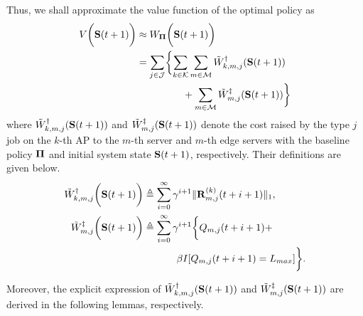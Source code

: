 Thus, we shall approximate the value function of the optimal policy as
\begin{align}
    V\Paren{\Stat(t+1)} &\approx W_{\Baseline}\Paren{\Stat(t+1)}
    \nonumber\\
    &= \sum_{j\in\jSpace}\Brace{
        \sum_{k\in\apSet}\sum_{m\in\esSet} \tilde{W}^{\AP}_{k,m,j}(\Stat(t+1))
        \nonumber\\
        &~~~~~~~~~~~~~~+\sum_{m\in\esSet} \tilde{W}^{\ES}_{m,j}(\Stat(t+1))
    }
\end{align}
where $\tilde{W}^{\dagger}_{k,m,j}(\mathbf{S}(t+1))$ and $\tilde{W}^{\ddagger}_{m,j}(\mathbf{S}(t+1))$ denote the cost raised by the type $j$ job on the $k$-th AP to the $m$-th server and $m$-th edge servers with the baseline policy $\boldsymbol{\Pi}$ and initial system state $\mathbf{S}(t+1)$, respectively.
Their definitions are given below.
{\small
\begin{align}
    \tilde{W}^{\dagger}_{k,m,j} \bigg(\mathbf{S}(t+1)\bigg) &\triangleq
        \sum_{i=0}^{\infty} \gamma^{i+1} \lVert\mathbf{R}^{(k)}_{m,j}(t+i+1)\|_1,
    \\    
    \tilde{W}^{\ddagger}_{m,j} \bigg(\mathbf{S}(t+1)\bigg) &\triangleq
        \sum_{i=0}^{\infty} \gamma^{i+1} \bigg\{
            Q_{m,j}(t+i+1) +
            \nonumber\\
            &~~~~~~~~~~\beta I[Q_{m,j}(t+i+1) = L_{max}]
        \bigg\}.
\end{align}
}

Moreover, the explicit expression of $\tilde{W}^{\dagger}_{k,m,j}(\mathbf{S}(t+1))$ and $\tilde{W}^{\ddagger}_{m,j}(\mathbf{S}(t+1))$ are derived in the following lemmas, respectively.

